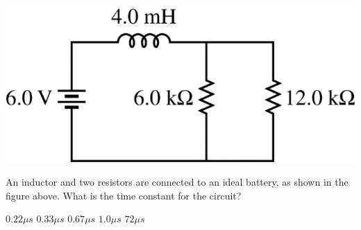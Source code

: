 \begin{center}
    \includegraphics[scale=0.4]{images/img-016-032.png}
\end{center}

\begin{questions}\setcounter{question}{33}\question
An inductor and two resistors are connected to an ideal battery, as shown in the figure above. What is the time constant for the circuit?

\begin{oneparchoices}
    \choice $0.22 \unit{\mu s}$
    \choice $0.33 \unit{\mu s}$
    \choice $0.67 \unit{\mu s}$
    \choice $1.0  \unit{\mu s}$
    \choice $72   \unit{\mu s}$
\end{oneparchoices}
\end{questions}
